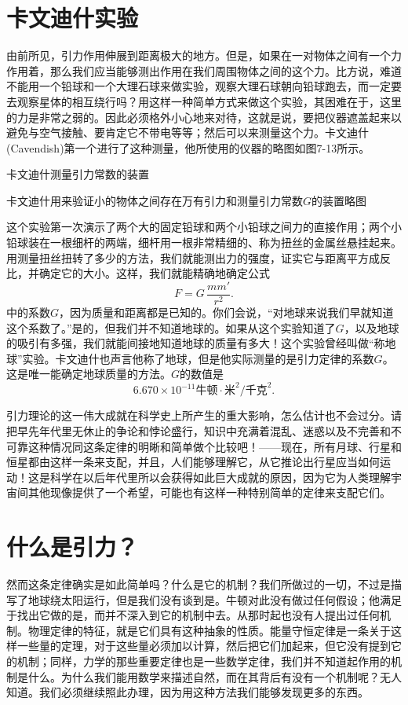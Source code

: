 \documentclass[12pt,oneside]{book}
\begin{document}
\begin{common-format}
\section{卡文迪什实验}
由前所见，引力作用伸展到距离极大的地方。但是，如果在一对物体之间有一个力作用着，那么我们应当能够测出作用在我们周围物体之间的这个力。比方说，难道不能用一个铅球和一个大理石球来做实验，观察大理石球朝向铅球跑去，而一定要去观察星体的相互绕行吗？用这样一种简单方式来做这个实验，其困难在于，这里的力是非常之弱的。因此必须格外小心地来对待，这就是说，要把仪器遮盖起来以避免与空气接触、要肯定它不带电等等；然后可以来测量这个力。卡文迪什(Cavendish)第一个进行了这种测量，他所使用的仪器的略图如图7-13所示。
\begin{fig}{卡文迪什测量引力常数的装置}
\caption{卡文迪什用来验证小的物体之间存在万有引力和测量引力常数$G$的装置略图}
\label{fig:卡文迪什测量引力常数的装置}
\end{fig}
这个实验第一次演示了两个大的固定铅球和两个小铅球之间力的直接作用；两个小铅球装在一根细杆的两端，细杆用一根非常精细的、称为扭丝的金属丝悬挂起来。用测量扭丝扭转了多少的方法，我们就能测出力的强度，证实它与距离平方成反比，并确定它的大小。这样，我们就能精确地确定公式
\begin{equation*}
F=G\,\frac{mm'}{r^2}.
\end{equation*}
中的系数$G$，因为质量和距离都是已知的。你们会说，“对地球来说我们早就知道这个系数了。”是的，但我们并不知道地球的。如果从这个实验知道了$G$，以及地球的吸引有多强，我们就能间接地知道地球的质量有多大！这个实验曾经叫做“称地球”实验。卡文迪什也声言他称了地球，但是他实际测量的是引力定律的系数$G$。这是唯一能确定地球质量的方法。$G$的数值是
\begin{equation*}
6.670\times10^{-11}\text{牛顿}\cdot\text{米}^2/\text{千克}^2.
\end{equation*}

引力理论的这一伟大成就在科学史上所产生的重大影响，怎么估计也不会过分。请把早先年代里无休止的争论和悖论盛行，知识中充满着混乱、迷惑以及不完善和不可靠这种情况同这条定律的明晰和简单做个比较吧！——现在，所有月球、行星和恒星都由这样一条来支配，并且，人们能够理解它，从它推论出行星应当如何运动！这是科学在以后年代里所以会获得如此巨大成就的原因，因为它为人类理解宇宙间其他现像提供了一个希望，可能也有这样一种特别简单的定律来支配它们。


\section{什么是引力？}
然而这条定律确实是如此简单吗？什么是它的机制？我们所做过的一切，不过是描写了地球绕太阳运行，但是我们没有谈到是。牛顿对此没有做过任何假设；他满足于找出它做的是，而并不深入到它的机制中去。从那时起也没有人提出过任何机制。物理定律的特征，就是它们具有这种抽象的性质。能量守恒定律是一条关于这样一些量的定理，对于这些量必须加以计算，然后把它们加起来，但它没有提到它的机制；同样，力学的那些重要定律也是一些数学定律，我们并不知道起作用的机制是什么。为什么我们能用数学来描述自然，而在其背后有没有一个机制呢？无人知道。我们必须继续照此办理，因为用这种方法我们能够发现更多的东西。


\end{common-format}
\end{document}
